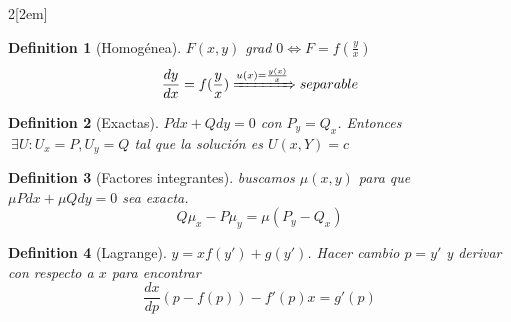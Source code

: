 \documentclass{myclass}
\newtheorem*{definition}{Definition}
\begin{document}
\begin{multicols}{2}[\columnsep2em]
\begin{definition}[Homogénea] $F(x,y)$ grad $0 \iff F = f(\frac{y}{x})$
  \[
  \frac{d y}{d x} = f(\frac{y}{x}) \xRightarrow{u(x) = \frac{y(x)}{x}} separable
  \] 
\end{definition}

\begin{definition}[Exactas] $Pdx + Qdy = 0$ con  $P_y=Q_x$. Entonces  $\ \exists U: U_x = P, U_y = Q$ tal que la solución es $U(x, Y) = c$
\end{definition}

\begin{definition}[Factores integrantes] buscamos $\mu(x, y)$ para que $\mu Pdx + \mu Qdy =0$ sea exacta.
\[
Q\mu_x-P\mu_y = \mu(P_y-Q_x)
\] 
\end{definition}

\begin{definition}[Lagrange] $y=xf(y')+g(y')$. Hacer cambio $p=y'$ y derivar con respecto a $x$ para encontrar
   \[
  \frac{d x}{d p}(p-f(p)) - f'(p)x=g'(p)  
  \] 
\end{definition}



\end{multicols}
\end{document}
